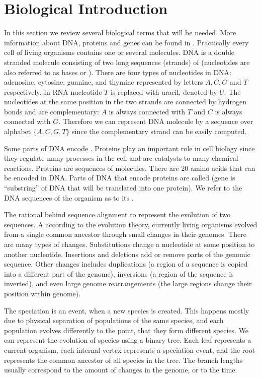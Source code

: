 \section{Biological Introduction}\label{SECTION:BIOINTRO}

In this section we review several biological terms that will be needed. More
information about DNA, proteins and genes can be found in
\cite{BiologyForDummies, UnderstandingBioinformatics}. Practically every cell of living
organisms contains one or several  molecules. DNA is a double
stranded molecule consisting of two long sequences (strands) of
 (nucleotides are also referred to as bases or
). There are four types of nucleotides in DNA: adenosine,
cytosine, guanine, and thymine represented by letters $A,C,G$ and $T$
respectively. In RNA nucleotide $T$ is replaced with uracil, denoted by $U$.
The nucleotides at the same position in
the two strands are connected by hydrogen bonds and are complementary: $A$ is
always connected with $T$ and $C$ is always connected with $G$. Therefore we
can represent DNA molecule by a sequence over alphabet $\{A,C,G,T\}$ since the
complementary strand can be easily computed.

Some parts of DNA encode . Proteins play an important role in cell
biology since  they regulate many processes in the cell and are catalysts to
many chemical reactions. Proteins are sequences of 
molecules. There are $20$ amino acids that can be encoded in DNA. Parts of DNA
that encode proteins are called  (gene is ``substring'' of
DNA that will be translated into one protein). We refer to the DNA
sequences of the organism as to its .

The rational behind sequence alignment to represent the evolution of two
sequences. A according to the evolution theory, currently living organisms
evolved from a single common ancestor through small changes in their genomes.
There are many types of changes.  Substitutions change  a nucleotide at some
position to another nucleotide.  Insertions and deletions add or remove parts
of the genomic sequence. Other changes includes duplications (a region of a
sequence is copied into a different part of the genome), inversions (a region
of the sequence is inverted), and even large genome rearrangements (the large
regions  change their position within genome). 

The speciation is an event, when a new species is created. This happens mostly
due to physical separation of populations of the same species, and each
population evolves differently to the point, that  they form
different species. We can represent the evolution of species using a binary
tree. Each leaf represents a current organism, each internal vertex represents
a speciation event, and the root represents the common ancestor of all species in
the tree. The branch lengths usually correspond to the amount of changes in
the genome, or to the time. 

